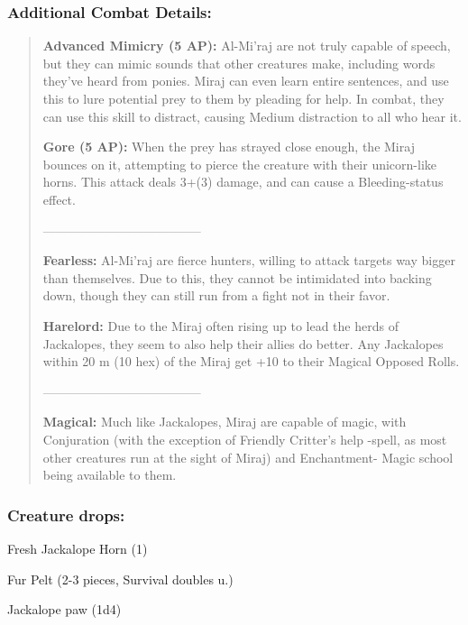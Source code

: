 \documentclass[11pt,a4paper,twocolumn]{book}
\begin{document}
	\subsubsection*{Additional Combat Details:}
	\begin{verse}
		\textbf{Advanced Mimicry (5 AP):\textbf{}} Al-Mi'raj are not truly capable of speech, but they can mimic sounds that other creatures make, including words they've heard from ponies. Miraj can even learn entire sentences, and use this to lure potential prey to them by pleading for help. In combat, they can use this skill to distract, causing Medium distraction to all who hear it.
		
		\textbf{Gore (5 AP):} When the prey has strayed close enough, the Miraj bounces on it, attempting to pierce the creature with their unicorn-like horns. This attack deals 3+(3) damage, and can cause a Bleeding-status effect.
		
		--------------------------------------
		
		\textbf{Fearless:} Al-Mi'raj are fierce hunters, willing to attack targets way bigger than themselves. Due to this, they cannot be intimidated into backing down, though they can still run from a fight not in their favor.
		
		\textbf{Harelord:} Due to the Miraj often rising up to lead the herds of Jackalopes, they seem to also help their allies do better. Any Jackalopes within 20 m (10 hex) of the Miraj get +10 to their Magical Opposed Rolls.
		
		--------------------------------------		
		
		\textbf{Magical:} Much like Jackalopes, Miraj are capable of magic, with Conjuration (with the exception of Friendly Critter's help -spell, as most other creatures run at the sight of Miraj) and Enchantment- Magic school being available to them.

	\end{verse}
	
	\subsubsection*{Creature drops:}
	\begin{compactitem}
		\item Fresh Jackalope Horn (1)
		\item Fur Pelt (2-3 pieces, Survival doubles u.)
		\item Jackalope paw (1d4)
	\end{compactitem}
	
\end{document}
